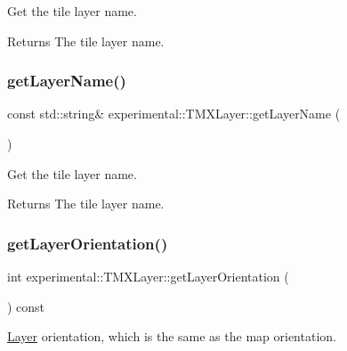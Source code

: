 Get the tile layer name.

\begin{DoxyReturn}{Returns}
The tile layer name. 
\end{DoxyReturn}
\mbox{\label{classexperimental_1_1TMXLayer_ae990c2f9653649658ae009cd6b75c8d8}} 
\subsubsection{\texorpdfstring{get\+Layer\+Name()}{getLayerName()}\hspace{0.1cm}{\footnotesize\ttfamily [2/2]}}
{\footnotesize\ttfamily const std\+::string\& experimental\+::\+T\+M\+X\+Layer\+::get\+Layer\+Name (\begin{DoxyParamCaption}{ }\end{DoxyParamCaption})\hspace{0.3cm}{\ttfamily [inline]}}

Get the tile layer name.

\begin{DoxyReturn}{Returns}
The tile layer name. 
\end{DoxyReturn}
\mbox{\label{classexperimental_1_1TMXLayer_a88cf778cbb137e03d2eec76d5f221825}} 
\subsubsection{\texorpdfstring{get\+Layer\+Orientation()}{getLayerOrientation()}\hspace{0.1cm}{\footnotesize\ttfamily [1/2]}}
{\footnotesize\ttfamily int experimental\+::\+T\+M\+X\+Layer\+::get\+Layer\+Orientation (\begin{DoxyParamCaption}{ }\end{DoxyParamCaption}) const\hspace{0.3cm}{\ttfamily [inline]}}

\hyperlink{classLayer}{Layer} orientation, which is the same as the map orientation.

